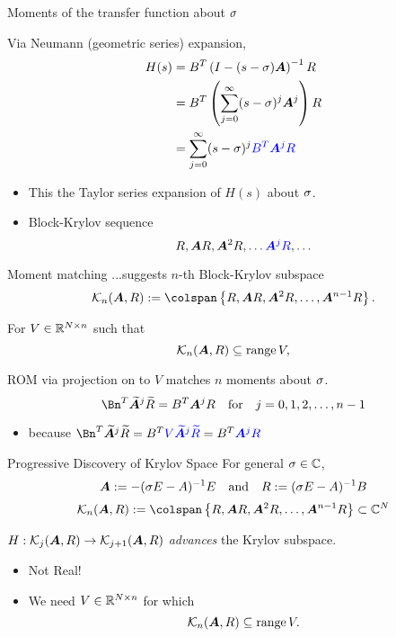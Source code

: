 \documentclass[serif]{beamer}
\newcommand{\Balert}[1]{\textcolor{blue}{#1}}
\begin{document}
\begin{frame}{Moments of the transfer function about $\sigma $}%
 
  Via Neumann (geometric series) expansion, 
  		\begin{align*}
  			H(s) &= B^T\left(I-(s-\xp )\A\right)^{-1}R \\
  				 &= B^T\left(\sum_{j=0}^\infty (s-\xp)^j\A^j\right)R\\
  				 &= \sum_{j=0}^\infty (s-\xp)^j \Balert{B^T\A^j R}
  		\end{align*}     		
  \begin{itemize}
  		\item This the Taylor series expansion of $H(s)$ about $\sigma$.
  		\item Block-Krylov sequence
  		      \[ R,\A R,\A^2R,\ldots \Balert{\A^j R},\ldots\]
  \end{itemize}   
\end{frame}
 
 
 
 
\begin{frame}{Moment matching}{}
...suggests \alert{$n$-th Block-Krylov subspace}
\[ 
  \krylov{n}{\A}{R}:= \colspan\left\{R,\A R,\A^2R,\ldots,\A^{n-1}R\right\}.
\]

For $V\in\mathbb{R}^{N\times n}$ such that
 \[  \mathcal{K}_{n}({\bm{A}},{R}) \subseteq \text{range}\,V, \]
 	
ROM via projection on to $V$ matches $n$ moments about $\sigma$.
\[
\Bn^T\widetilde{\A}^j \widetilde{R} = B^T\A^j R\quad\text{for}\quad j=0,1,2,\ldots,n-1
\]
\begin{itemize}
\item because $\Bn^T \widetilde{\A}^j \widetilde{R} 
= B^T \Balert{V \widetilde{\A}^j \widetilde{R}} = B^T\Balert{\A^j R }$  
\end{itemize}
\end{frame}



\begin{frame}{Progressive Discovery of Krylov Space}
For general $\sigma\in\mathbb{C}$,
\[ \bm{A} := -(\sigma E-A)^{-1}E\quad\text{and}\quad R := (\sigma E-A)^{-1}B \]
\[ 
  \krylov{n}{\A}{R}:= \colspan\left\{R,\A R,\A^2R,\ldots,\A^{n-1}R\right\}
	\subset\C^N
\]

\medskip
$H:\mathcal{K}_{j}({\bm{A}},{R})\rightarrow\mathcal{K}_{j+1}({\bm{A}},{R})$ 
\emph{advances} the Krylov subspace.

\medskip
\begin{itemize}
\item Not Real! 

\item We need $V\in\mathbb{R}^{N\times n}$ for which 
\[ \mathcal{K}_{n}({\bm{A}},{R}) \subseteq \text{range}\,V. \]
\end{itemize}
\end{frame}
\end{document}
